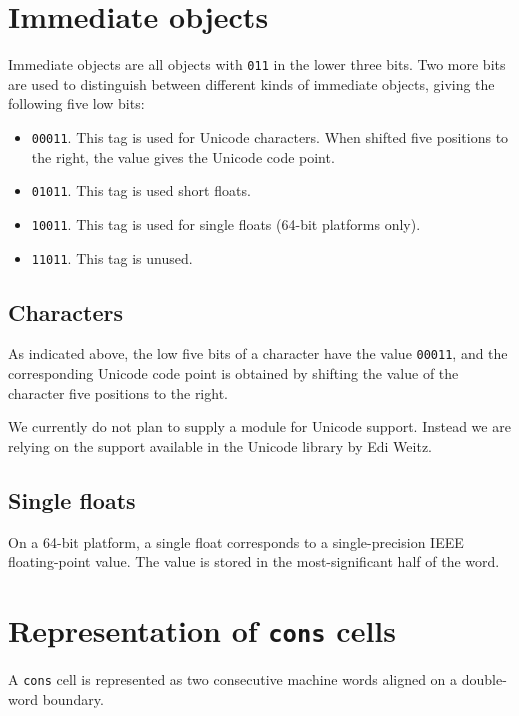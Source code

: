 \section{Immediate objects}
\label{sec-data-representation-immediate-objects}

Immediate objects are all objects with \texttt{011} in the lower three
bits.  Two more bits are used to distinguish between different kinds
of immediate objects, giving the following five low bits:

\begin{itemize}
\item \texttt{00011}.  This tag is used for Unicode characters.  When
  shifted five positions to the right, the value gives the Unicode
  code point.
\item \texttt{01011}.  This tag is used short floats.
\item \texttt{10011}.  This tag is used for single floats (64-bit
  platforms only).
\item \texttt{11011}.  This tag is unused.
\end{itemize}

\subsection{Characters}

As indicated above, the low five bits of a character have the value
\texttt{00011}, and the corresponding Unicode code point is obtained by
shifting the value of the character five positions to the right.

We currently do not plan to supply a module for Unicode support.
Instead we are relying on the support available in the Unicode library
by Edi Weitz.

\subsection{Single floats}

On a 64-bit platform, a single float corresponds to a single-precision
IEEE floating-point value.  The value is stored in the
most-significant half of the word.

\section{Representation of \texttt{cons} cells}
\label{sec-data-representation-cons-cells}

A \texttt{cons} cell is represented as two consecutive machine
words aligned on a double-word boundary.

